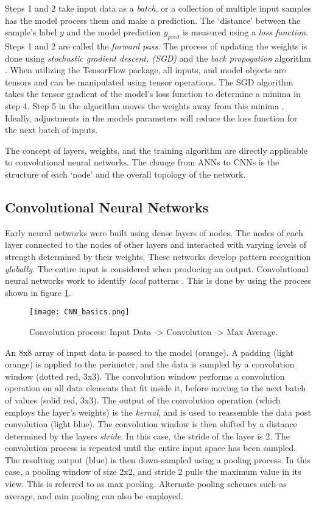 		Steps 1 and 2 take input data as a \textit{batch}, or a collection of multiple input samples has the model process them and make a prediction.  The `distance' between the sample's label $y$ and the model prediction $y_{pred}$ is measured using a \textit{loss function}. Steps 1 and 2 are called the \textit{forward pass}.	The process of updating the weights is done using \textit{stochastic gradient descent, (SGD)} and the \textit{back propogation} algorithm  \cite{BP}. When utilizing the TensorFlow package, all inputs, and model objects are tensors and can be manipulated using tensor operations. The SGD algorithm takes the tensor gradient of the model's loss function to determine a minima in step 4. Step 5 in the algorithm moves the weights away from this minima \cite{Chollet}.  Ideally, adjustments in the models parameters will reduce the loss function for the next batch of inputs.

		The concept of layers, weights, and the training algorithm are directly applicable to convolutional neural networks. The change from ANNs to CNNs is the structure of each `node' and the overall topology of the network.


	\subsection{Convolutional Neural Networks}

		Early neural networks were built using dense layers of nodes. The nodes of each layer connected to the nodes of other layers and interacted with varying levels of strength determined by their weights. These networks develop pattern recognition \textit{globally}. The entire input is considered when producing an output. Convolutional neural networks work to identify \textit{local} patterns \cite{Chollet}. This is done by using the process shown in figure \ref{fig:convo}.

		\begin{figure}[htbp]
			\centering
			 \texttt{[image: CNN\_basics.png]}
			\caption[CNN overview]{Convolution process:  Input Data -> Convolution -> Max Average.}
			\label{fig:convo}
		\end{figure}

		An 8x8 array of input data is passed to the model (orange). A padding (light orange) is applied to the perimeter, and the data is sampled by a convolution window (dotted red, 3x3). The convolution window performs a convolution operation on all data elements that fit inside it, before moving to the next batch of values (solid red, 3x3). The output of the convolution operation (which employs the layer's weights) is the \textit{kernal}, and is used to reassemble the data post convolution (light blue). The convolution window is then shifted by a distance determined by the layers \textit{stride}. In this case, the stride of the layer is 2. The convolution process is repeated until the entire input space has been sampled. The resulting output (blue) is then down-sampled using a pooling process. In this case, a pooling window of size 2x2, and stride 2 pulls the maximum value in its view. This is referred to as max pooling. Alternate pooling schemes such as average, and min pooling can also be employed.

